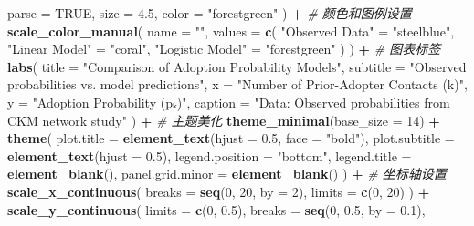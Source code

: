 \documentclass[
]{article}
\newenvironment{Shaded}{\begin{snugshade}}{\end{snugshade}}
\newcommand{\AttributeTok}[1]{\textcolor[rgb]{0.13,0.29,0.53}{#1}}
\newcommand{\CommentTok}[1]{\textcolor[rgb]{0.56,0.35,0.01}{\textit{#1}}}
\newcommand{\ConstantTok}[1]{\textcolor[rgb]{0.56,0.35,0.01}{#1}}
\newcommand{\DecValTok}[1]{\textcolor[rgb]{0.00,0.00,0.81}{#1}}
\newcommand{\FloatTok}[1]{\textcolor[rgb]{0.00,0.00,0.81}{#1}}
\newcommand{\FunctionTok}[1]{\textcolor[rgb]{0.13,0.29,0.53}{\textbf{#1}}}
\newcommand{\NormalTok}[1]{#1}
\newcommand{\OtherTok}[1]{\textcolor[rgb]{0.56,0.35,0.01}{#1}}
\newcommand{\SpecialCharTok}[1]{\textcolor[rgb]{0.81,0.36,0.00}{\textbf{#1}}}
\newcommand{\StringTok}[1]{\textcolor[rgb]{0.31,0.60,0.02}{#1}}
\begin{document}
\begin{Shaded}
\begin{Highlighting}[]
    \AttributeTok{parse =} \ConstantTok{TRUE}\NormalTok{,}
    \AttributeTok{size =} \FloatTok{4.5}\NormalTok{,}
    \AttributeTok{color =} \StringTok{"forestgreen"}
\NormalTok{  ) }\SpecialCharTok{+}
  \CommentTok{\# 颜色和图例设置}
  \FunctionTok{scale\_color\_manual}\NormalTok{(}
    \AttributeTok{name =} \StringTok{""}\NormalTok{,}
    \AttributeTok{values =} \FunctionTok{c}\NormalTok{(}
      \StringTok{"Observed Data"} \OtherTok{=} \StringTok{"steelblue"}\NormalTok{,}
      \StringTok{"Linear Model"} \OtherTok{=} \StringTok{"coral"}\NormalTok{,}
      \StringTok{"Logistic Model"} \OtherTok{=} \StringTok{"forestgreen"}
\NormalTok{    )}
\NormalTok{  ) }\SpecialCharTok{+}
  \CommentTok{\# 图表标签}
  \FunctionTok{labs}\NormalTok{(}
    \AttributeTok{title =} \StringTok{"Comparison of Adoption Probability Models"}\NormalTok{,}
    \AttributeTok{subtitle =} \StringTok{"Observed probabilities vs. model predictions"}\NormalTok{,}
    \AttributeTok{x =} \StringTok{"Number of Prior{-}Adopter Contacts (k)"}\NormalTok{,}
    \AttributeTok{y =} \StringTok{"Adoption Probability (pₖ)"}\NormalTok{,}
    \AttributeTok{caption =} \StringTok{"Data: Observed probabilities from CKM network study"}
\NormalTok{  ) }\SpecialCharTok{+}
  \CommentTok{\# 主题美化}
  \FunctionTok{theme\_minimal}\NormalTok{(}\AttributeTok{base\_size =} \DecValTok{14}\NormalTok{) }\SpecialCharTok{+}
  \FunctionTok{theme}\NormalTok{(}
    \AttributeTok{plot.title =} \FunctionTok{element\_text}\NormalTok{(}\AttributeTok{hjust =} \FloatTok{0.5}\NormalTok{, }\AttributeTok{face =} \StringTok{"bold"}\NormalTok{),}
    \AttributeTok{plot.subtitle =} \FunctionTok{element\_text}\NormalTok{(}\AttributeTok{hjust =} \FloatTok{0.5}\NormalTok{),}
    \AttributeTok{legend.position =} \StringTok{"bottom"}\NormalTok{,}
    \AttributeTok{legend.title =} \FunctionTok{element\_blank}\NormalTok{(),}
    \AttributeTok{panel.grid.minor =} \FunctionTok{element\_blank}\NormalTok{()}
\NormalTok{  ) }\SpecialCharTok{+}
  \CommentTok{\# 坐标轴设置}
  \FunctionTok{scale\_x\_continuous}\NormalTok{(}
    \AttributeTok{breaks =} \FunctionTok{seq}\NormalTok{(}\DecValTok{0}\NormalTok{, }\DecValTok{20}\NormalTok{, }\AttributeTok{by =} \DecValTok{2}\NormalTok{),}
    \AttributeTok{limits =} \FunctionTok{c}\NormalTok{(}\DecValTok{0}\NormalTok{, }\DecValTok{20}\NormalTok{)}
\NormalTok{  ) }\SpecialCharTok{+}
  \FunctionTok{scale\_y\_continuous}\NormalTok{(}
    \AttributeTok{limits =} \FunctionTok{c}\NormalTok{(}\DecValTok{0}\NormalTok{, }\FloatTok{0.5}\NormalTok{),}
    \AttributeTok{breaks =} \FunctionTok{seq}\NormalTok{(}\DecValTok{0}\NormalTok{, }\FloatTok{0.5}\NormalTok{, }\AttributeTok{by =} \FloatTok{0.1}\NormalTok{),}

\end{Highlighting}
\end{Shaded}
\end{document}
